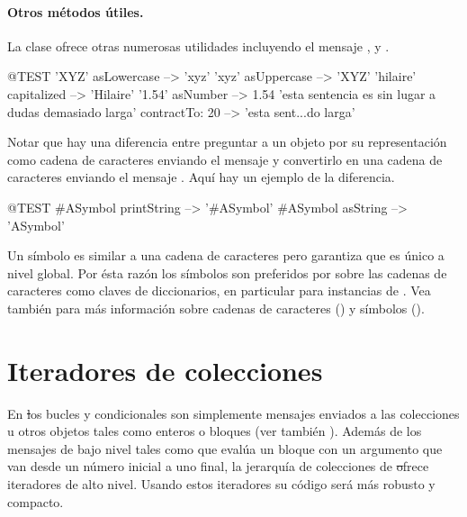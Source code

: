 \documentclass[a4paper,10pt,twoside]{book}
\begin{document}
\paragraph{Otros m\'etodos \'utiles.}
La clase  ofrece otras numerosas utilidades incluyendo el mensaje ,  y . 

\begin{code}{@TEST}
'XYZ' asLowercase --> 'xyz'
'xyz' asUppercase   --> 'XYZ'
'hilaire' capitalized   --> 'Hilaire'
'1.54' asNumber      --> 1.54
'esta sentencia es sin lugar a dudas demasiado larga' contractTo: 20 -->  'esta sent...do larga'
\end{code}

Notar que hay una diferencia entre preguntar a un objeto por su representaci\'on como cadena de caracteres enviando el mensaje  y convertirlo en una cadena de caracteres enviando el mensaje .
Aqu\'i hay un ejemplo de la diferencia.

\begin{code}{@TEST}
#ASymbol printString --> '#ASymbol'
#ASymbol asString    --> 'ASymbol'
\end{code}

Un s\'imbolo es similar a una cadena de caracteres pero garantiza que es \'unico a nivel global. Por \'esta raz\'on los s\'imbolos son preferidos por sobre las cadenas de caracteres como claves de diccionarios, en particular para instancias de .
Vea tambi\'en  para m\'as informaci\'on sobre cadenas de caracteres () y s\'imbolos ().

\section{Iteradores de colecciones}

En \st los bucles y condicionales son simplemente mensajes enviados a las colecciones u otros objetos tales como enteros o bloques (ver tambi\'en ). Adem\'as de los mensajes de bajo nivel tales como  que eval\'ua un bloque con un argumento que van desde un n\'umero inicial a uno final, la jerarqu\'ia de colecciones de \st ofrece iteradores de alto nivel. Usando estos iteradores su c\'odigo ser\'a m\'as robusto y compacto. 
\end{document}

